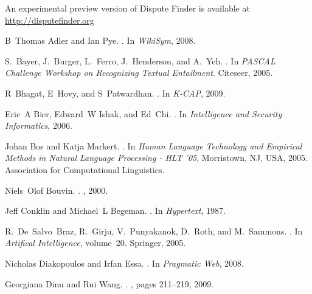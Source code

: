 \documentclass{www2010-accepted}
\begin{document}
An experimental preview version of Dispute Finder is available at 
\url{http://disputefinder.org}

\begin{thebibliography}{10}

B~Thomas Adler and Ian Pye.
.
\newblock In {\em WikiSym}, 2008.

S.~Bayer, J.~Burger, L.~Ferro, J.~Henderson, and A.~Yeh.
.
\newblock In {\em PASCAL Challenge Workshop on Recognizing Textual Entailment}.
  Citeseer, 2005.

R~Bhagat, E~Hovy, and S~Patwardhan.
.
\newblock In {\em K-CAP}, 2009.

Eric~A Bier, Edward~W Ishak, and Ed~Chi.
.
\newblock In {\em Intelligence and Security Informatics}, 2006.

Johan Bos and Katja Markert.
.
\newblock In {\em Human Language Technology and Empirical Methods in Natural
  Language Processing - HLT '05}, Morristown, NJ, USA, 2005. Association for
  Computational Linguistics.

Niels~Olof Bouvin.
.
, 2000.

Jeff Conklin and Michael~L Begeman.
.
\newblock In {\em Hypertext}, 1987.

R.~De~Salvo~Braz, R.~Girju, V.~Punyakanok, D.~Roth, and M.~Sammons.
.
\newblock In {\em Artifical Intelligence}, volume~20. Springer, 2005.

Nicholas Diakopoulos and Irfan Essa.
.
\newblock In {\em Pragmatic Web}, 2008.

Georgiana Dinu and Rui Wang.
.
, pages 211--219, 2009.


\end{thebibliography}
\end{document}
